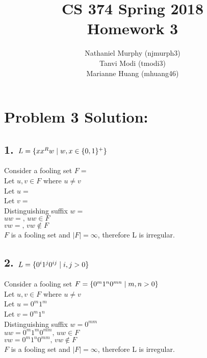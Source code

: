 \documentclass[11pt]{article}
\title{\textbf{CS 374 Spring 2018 \\
				Homework 3}}
\author{Nathaniel Murphy (njmurph3) \\
		Tanvi Modi (tmodi3) \\
		Marianne Huang (mhuang46)}
\date{}
\begin{document}
\maketitle

\section*{Problem 3 Solution:}

\subsection*{1. $L = \{xx^Rw\hspace{1mm}|\hspace{1mm}w,x \in \{0, 1\}^+\}$}
\begin{addmargin}[2em]{0em}
Consider a fooling set $F = $ \\
Let $u, v \in F$ where $u \neq v$ \\
Let $u = $ \\
Let $v = $ \\
Distinguishing suffix $w = $ \\
$uw = \text{, } uw \in F$ \\
$vw = \text{, } vw \notin F$ \\
$F$ is a fooling set and $|F| = \infty$, therefore L is irregular.
\end{addmargin}

\subsection*{2. $L = \{0^i1^j0^{ij}\hspace{1mm}|\hspace{1mm}i,j > 0\}$}
\begin{addmargin}[2em]{0em}
Consider a fooling set $F = \{0^m1^n0^{mn}\hspace{1mm}|\hspace{1mm}m,n > 0\}$ \\
Let $u, v \in F$ where $u \neq v$ \\
Let $u = 0^m1^m$ \\
Let $v = 0^m1^n$ \\
Distinguishing suffix $w = 0^{mm}$ \\
$uw = 0^m1^m0^{mm}\text{, } uw \in F$ \\
$vw = 0^m1^n0^{mm}\text{, } vw \notin F$ \\
$F$ is a fooling set and $|F| = \infty$, therefore L is irregular.
\end{addmargin}
\end{document}

